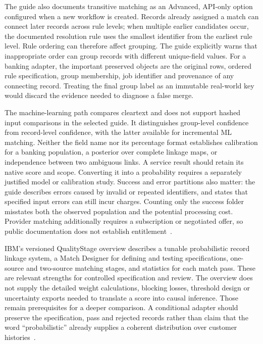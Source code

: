The guide also documents transitive matching as an Advanced, API-only option
configured when a new workflow is created. Records already assigned a match can
connect later records across rule levels; when multiple earlier candidates occur,
the documented resolution rule uses the smallest identifier from the earliest
rule level. Rule ordering can therefore affect grouping. The guide explicitly
warns that inappropriate order can group records with different unique-field
values. For a banking adapter, the important preserved objects are the original
rows, ordered rule specification, group membership, job identifier and provenance
of any connecting record. Treating the final group label as an immutable real-world
key would discard the evidence needed to diagnose a false merge.

The machine-learning path compares cleartext and does not support hashed input
comparisons in the selected guide. It distinguishes group-level confidence from
record-level confidence, with the latter available for incremental ML matching.
Neither the field name nor its percentage format establishes calibration for a
banking population, a posterior over complete linkage maps, or independence
between two ambiguous links. A service result should retain its native score and
scope. Converting it into a probability requires a separately justified model or
calibration study. Success and error partitions also matter: the guide describes
errors caused by invalid or repeated identifiers, and states that specified input
errors can still incur charges. Counting only the success folder misstates both
the observed population and the potential processing cost. Provider matching
additionally requires a subscription or negotiated offer, so public documentation
does not establish entitlement~\citep{exec22_obs_aws_er_manual}.

IBM's versioned QualityStage overview describes a tunable probabilistic record
linkage system, a Match Designer for defining and testing specifications,
one-source and two-source matching stages, and statistics for each match pass.
These are relevant strengths for controlled specification and review. The
overview does not supply the detailed weight calculations, blocking losses,
threshold design or uncertainty exports needed to translate a score into causal
inference. Those remain prerequisites for a deeper comparison. A conditional
adapter should preserve the specification, pass and rejected records rather than
claim that the word ``probabilistic'' already supplies a coherent distribution
over customer histories~\citep{exec22_obs_ibm_matching}.

